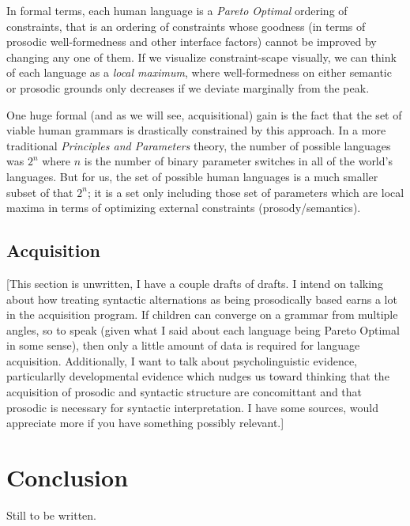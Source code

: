 \documentclass{article}
\begin{document}
In formal terms, each human language is a \textit{Pareto Optimal} ordering of constraints, that is an ordering of constraints whose goodness (in terms of prosodic well-formedness and other interface factors) cannot be improved by changing any one of them. If we visualize constraint-scape visually, we can think of each language as a \emph{local maximum}, where well-formedness on either semantic or prosodic grounds only decreases if we deviate marginally from the peak.

One huge formal (and as we will see, acquisitional) gain is the fact that the set of viable human grammars is drastically constrained by this approach. In a more traditional \textit{Principles and Parameters} theory, the number of possible languages was $2^n$ where $n$ is the number of binary parameter switches in all of the world's languages. But for us, the set of possible human languages is a much smaller subset of that $2^n$; it is a set only including those set of parameters which are local maxima in terms of optimizing external constraints (prosody/semantics).


\subsection{Acquisition}

[This section is unwritten, I have a couple drafts of drafts. I intend on talking about how treating syntactic alternations as being prosodically based earns a lot in the acquisition program. If children can converge on a grammar from multiple angles, so to speak (given what I said about each language being Pareto Optimal in some sense), then only a little amount of data is required for language acquisition. Additionally, I want to talk about psycholinguistic evidence, particularlly developmental evidence which nudges us toward thinking that the acquisition of prosodic and syntactic structure are concomittant and that prosodic is necessary for syntactic interpretation. I have some sources, would appreciate more if you have something possibly relevant.]




\section{Conclusion}

Still to be written.




\end{document}
